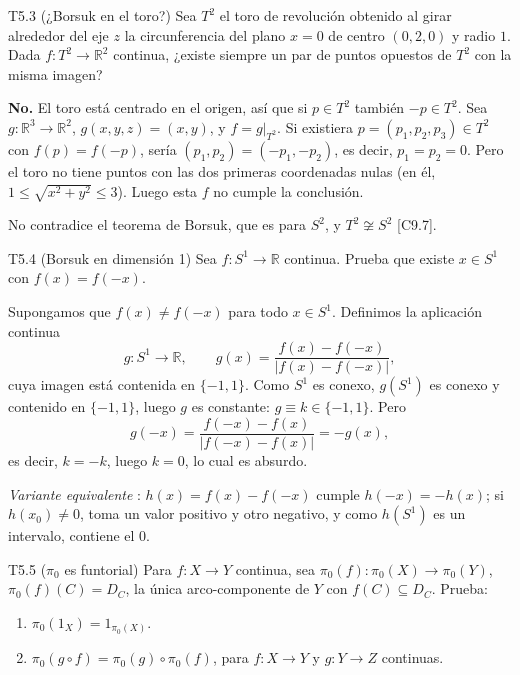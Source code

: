 \begin{ejercicio}{T5.3 (¿Borsuk en el toro?)}
Sea $T^2$ el toro de revolución obtenido al girar alrededor del eje $z$ la circunferencia del plano $x = 0$ de centro $(0,2,0)$ y radio $1$. Dada $f \colon T^2 \to \mathbb{R}^2$ continua, ¿existe siempre un par de puntos opuestos de $T^2$ con la misma imagen?

\sol {}

\textbf{No.} El toro está centrado en el origen, así que si $p \in T^2$ también $-p \in T^2$. Sea $g \colon \mathbb{R}^3 \to \mathbb{R}^2$, $g(x,y,z) = (x,y)$, y $f = g|_{T^2}$. Si existiera $p = (p_1,p_2,p_3) \in T^2$ con $f(p) = f(-p)$, sería $(p_1,p_2) = (-p_1,-p_2)$, es decir, $p_1 = p_2 = 0$. Pero el toro no tiene puntos con las dos primeras coordenadas nulas (en él, $1 \leq \sqrt{x^2+y^2} \leq 3$). Luego esta $f$ no cumple la conclusión.

No contradice el teorema de Borsuk, que es para $S^2$, y $T^2 \not\cong S^2$ [C9.7].
\end{ejercicio}

\begin{ejercicio}{T5.4 (Borsuk en dimensión 1)}
Sea $f \colon S^1 \to \mathbb{R}$ continua. Prueba que existe $x \in S^1$ con $f(x) = f(-x)$.

\sol {}

Supongamos que $f(x) \neq f(-x)$ para todo $x \in S^1$. Definimos la aplicación continua
\[ g \colon S^1 \to \mathbb{R}, \qquad g(x) = \frac{f(x) - f(-x)}{|f(x) - f(-x)|}, \]
cuya imagen está contenida en $\{-1,1\}$. Como $S^1$ es conexo, $g(S^1)$ es conexo y contenido en $\{-1,1\}$, luego $g$ es constante: $g \equiv k \in \{-1,1\}$. Pero
\[ g(-x) = \frac{f(-x) - f(x)}{|f(-x) - f(x)|} = -g(x), \]
es decir, $k = -k$, luego $k = 0$, lo cual es absurdo.

\emph{Variante equivalente} \fuentepropia: $h(x) = f(x) - f(-x)$ cumple $h(-x) = -h(x)$; si $h(x_0) \neq 0$, toma un valor positivo y otro negativo, y como $h(S^1)$ es un intervalo, contiene el $0$.
\end{ejercicio}

\begin{ejercicio}{T5.5 ($\pi_0$ es funtorial)}
Para $f \colon X \to Y$ continua, sea $\pi_0(f) \colon \pi_0(X) \to \pi_0(Y)$, $\pi_0(f)(C) = D_C$, la única arco-componente de $Y$ con $f(C) \subseteq D_C$. Prueba:
\begin{enumerate}
    \item[a)] $\pi_0(1_X) = 1_{\pi_0(X)}$.
    \item[b)] $\pi_0(g \circ f) = \pi_0(g) \circ \pi_0(f)$, para $f \colon X \to Y$ y $g \colon Y \to Z$ continuas.
\end{enumerate}

\end{ejercicio}

